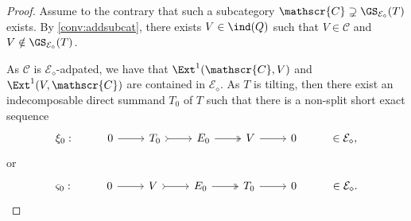 
\begin{proof}
Assume to the contrary that such a subcategory $\mathscr{C} \supsetneq \GS_{\mathcal{E}_\diamond}(T)$ exists. By \cref{conv:addsubcat}, there exists $V \in \ind(Q)$ such that $V \in \mathscr{C}$ and $V \notin \GS_{\mathcal{E}_\diamond}(T)$.

As $\mathscr{C}$ is $\mathcal{E}_\diamond$-adpated, we have that $\Ext^1(\mathscr{C},V)$ and $\Ext^1(V,\mathscr{C})$ are contained in $\mathcal{E}_\diamond$. As $T$ is tilting, then there exist an indecomposable direct summand $T_0$ of $T$ such that there is a non-split short exact sequence \[\begin{tikzcd}
	\xi_0: & 0 & T_0 & E_0 & V &  0 & \in \mathcal{E}_\diamond,
	\arrow[from=1-2, to=1-3]
	\arrow[tail, from=1-3, to=1-4]
	\arrow[two heads,from=1-4, to=1-5]
	\arrow[from=1-5, to=1-6]
\end{tikzcd}\]  or \[\begin{tikzcd}
	\varsigma_0: & 0 & V & E_0 & T_0 &  0 & \in \mathcal{E}_\diamond.
	\arrow[from=1-2, to=1-3]
	\arrow[tail, from=1-3, to=1-4]
	\arrow[two heads,from=1-4, to=1-5]
	\arrow[from=1-5, to=1-6]
\end{tikzcd}\]


\end{proof}
